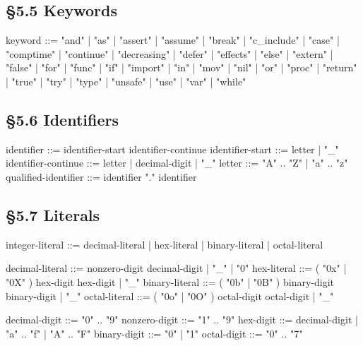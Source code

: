 \subsection*{§5.5 Keywords}
\label{gram:keyword}
\begin{grammar}
keyword ::=
    "and"       | "as"       | "assert"   | "assume"   | "break"
  | "c_include" | "case"     | "comptime" | "continue" | "decreasing"
  | "defer"     | "effects"  | "else"     | "extern"   | "false"
  | "for"       | "func"     | "if"       | "import"   | "in"
  | "mov"       | "nil"      | "or"       | "proc"     | "return"
  | "true"      | "try"      | "type"     | "unsafe"   | "use"
  | "var"       | "while"

\end{grammar}

\subsection*{§5.6 Identifiers}
\label{gram:identifier}
\begin{grammar}
identifier           ::= identifier-start { identifier-continue }    %
identifier-start     ::= letter | "_"
identifier-continue  ::= letter | decimal-digit | "_"
letter               ::= "A" .. "Z" | "a" .. "z"
qualified-identifier ::= identifier { "." identifier }
\end{grammar}

\subsection*{§5.7 Literals}
\label{gram:integer-literal}
\begin{grammar}
integer-literal  ::=
    decimal-literal
  | hex-literal
  | binary-literal
  | octal-literal

decimal-literal  ::= nonzero-digit { decimal-digit | "_" }
                   | "0"                          %
hex-literal      ::= ( "0x" | "0X" ) hex-digit { hex-digit | "_" }
binary-literal   ::= ( "0b" | "0B" ) binary-digit { binary-digit | "_" }
octal-literal    ::= ( "0o" | "0O" ) octal-digit { octal-digit | "_" }

decimal-digit    ::= "0" .. "9"
nonzero-digit    ::= "1" .. "9"
hex-digit        ::= decimal-digit | "a" .. "f" | "A" .. "F"
binary-digit     ::= "0" | "1"
octal-digit      ::= "0" .. "7"
\end{grammar}

